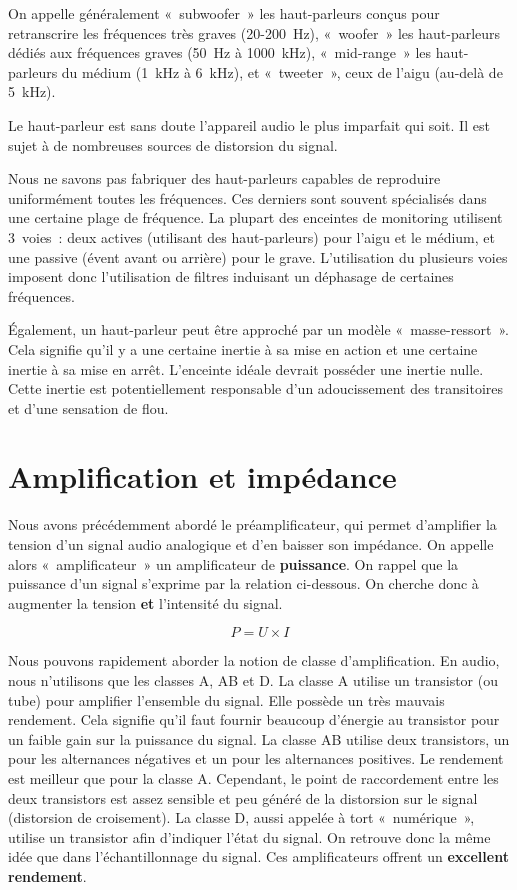 \documentclass[
]{book}
\begin{document}
On appelle généralement «~subwoofer~» les haut-parleurs conçus pour retranscrire les fréquences très graves (20-200~Hz), «~woofer~» les haut-parleurs dédiés aux fréquences graves (50~Hz à 1000~kHz), «~mid-range~» les haut-parleurs du médium (1~kHz à 6~kHz), et «~tweeter~», ceux de l'aigu (au-delà de 5~kHz).

Le haut-parleur est sans doute l'appareil audio le plus imparfait qui soit. Il est sujet à de nombreuses sources de distorsion du signal.

Nous ne savons pas fabriquer des haut-parleurs capables de reproduire uniformément toutes les fréquences. Ces derniers sont souvent spécialisés dans une certaine plage de fréquence. La plupart des enceintes de monitoring utilisent 3~voies~: deux actives (utilisant des haut-parleurs) pour l'aigu et le médium, et une passive (évent avant ou arrière) pour le grave. L'utilisation du plusieurs voies imposent donc l'utilisation de filtres induisant un déphasage de certaines fréquences.

Également, un haut-parleur peut être approché par un modèle «~masse-ressort~». Cela signifie qu'il y a une certaine inertie à sa mise en action et une certaine inertie à sa mise en arrêt. L'enceinte idéale devrait posséder une inertie nulle. Cette inertie est potentiellement responsable d'un adoucissement des transitoires et d'une sensation de flou.

\hypertarget{amplification-et-impuxe9dance}{%
\section{Amplification et impédance}\label{amplification-et-impuxe9dance}}

Nous avons précédemment abordé le préamplificateur, qui permet d'amplifier la tension d'un signal audio analogique et d'en baisser son impédance. On appelle alors «~amplificateur~» un amplificateur de \textbf{puissance}. On rappel que la puissance d'un signal s'exprime par la relation ci-dessous. On cherche donc à augmenter la tension \textbf{et} l'intensité du signal.

\[ P = U \times I \]

Nous pouvons rapidement aborder la notion de classe d'amplification. En audio, nous n'utilisons que les classes A, AB et D. La classe A utilise un transistor (ou tube) pour amplifier l'ensemble du signal. Elle possède un très mauvais rendement. Cela signifie qu'il faut fournir beaucoup d'énergie au transistor pour un faible gain sur la puissance du signal. La classe AB utilise deux transistors, un pour les alternances négatives et un pour les alternances positives. Le rendement est meilleur que pour la classe A. Cependant, le point de raccordement entre les deux transistors est assez sensible et peu généré de la distorsion sur le signal (distorsion de croisement). La classe D, aussi appelée à tort «~numérique~», utilise un transistor afin d'indiquer l'état du signal. On retrouve donc la même idée que dans l'échantillonnage du signal. Ces amplificateurs offrent un \textbf{excellent rendement}.
\end{document}
